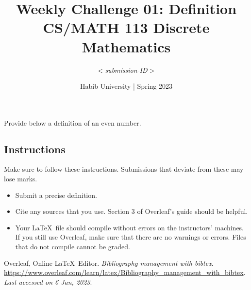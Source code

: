 \documentclass[a4paper]{exam}
\title{Weekly Challenge 01: Definition\\CS/MATH 113 Discrete Mathematics}
\author{$<$\textit{submission-ID}$>$}  %
\date{Habib University | Spring 2023}
\begin{document}
\maketitle

\begin{questions}
  

  Provide below a definition of an even number.

  \subsection*{Instructions}
  Make sure to follow these instructions. Submissions that deviate from these may lose marks.
  \begin{itemize}
  \item Submit a precise definition.
  \item Cite any sources that you use. Section 3 of Overleaf's guide \cite{overleaf} should be helpful.
  \item Your \LaTeX\ file should compile without errors on the instructors' machines. If you still use Overleaf, make sure that there are no warnings or errors. Files that do not compile cannot be graded.
  \end{itemize}
  
  \begin{solution}
  \end{solution}
\end{questions}

\begin{thebibliography}{9}
  Overleaf, Online \LaTeX\ Editor. \emph{Bibliography management with bibtex}. \url{https://www.overleaf.com/learn/latex/Bibliography_management_with_bibtex}. \textit{Last accessed on 6 Jan, 2023}.
\end{thebibliography}
\end{document}
